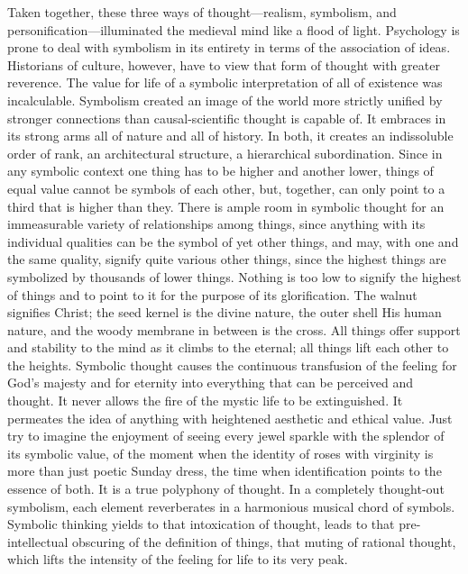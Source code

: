 Taken together, these three ways of thought---realism, symbolism, and
personification---illuminated the medieval mind like a flood of light.
Psychology is prone to deal with symbolism in its entirety in terms of
the association of ideas. Historians of culture, however, have to view
that form of thought with greater reverence. The value for life of a
symbolic interpretation of all of existence was incalculable. Symbolism
created an image of the world more strictly unified by stronger
connections than causal-scientific thought is capable of. It embraces in
its strong arms all of nature and all of history. In both, it creates an
indissoluble order of rank, an architectural structure, a hierarchical
subordination. Since in any
\protect\hypertarget{16_Chapter_Nine__THE_DECLINE_OF_SYM.xhtmlux5cux23page_239}{}{}symbolic
context one thing has to be higher and another lower, things of equal
value cannot be symbols of each other, but, together, can only point to
a third that is higher than they. There is ample room in symbolic
thought for an immeasurable variety of relationships among things, since
anything with its individual qualities can be the symbol of yet other
things, and may, with one and the same quality, signify quite various
other things, since the highest things are symbolized by thousands of
lower things. Nothing is too low to signify the highest of things and to
point to it for the purpose of its glorification. The walnut signifies
Christ; the seed kernel is the divine nature, the outer shell His human
nature, and the woody membrane in between is the cross. All things offer
support and stability to the mind as it climbs to the eternal; all
things lift each other to the heights. Symbolic thought causes the
continuous transfusion of the feeling for God's majesty and for eternity
into everything that can be perceived and thought. It never allows the
fire of the mystic life to be extinguished. It permeates the idea of
anything with heightened aesthetic and ethical value. Just try to
imagine the enjoyment of seeing every jewel sparkle with the splendor of
its symbolic value, of the moment when the identity of roses with
virginity is more than just poetic Sunday dress, the time when
identification points to the essence of both. It is a true polyphony of
thought. In a completely thought-out symbolism, each element
reverberates in a harmonious musical chord of symbols. Symbolic thinking
yields to that intoxication of thought, leads to that pre-intellectual
obscuring of the definition of things, that muting of rational thought,
which lifts the intensity of the feeling for life to its very peak.


